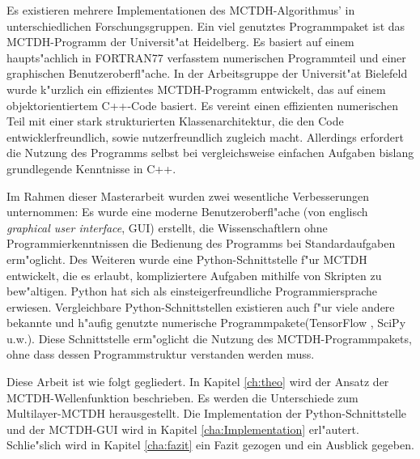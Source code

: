 Es existieren mehrere Implementationen des MCTDH-Algorithmus' in unterschiedlich\-en Forschungsgruppen.
Ein viel genutztes Programmpaket ist das MCTDH-Programm der Universit"at Heidelberg\cite{Heidelberg}. Es
basiert auf einem haupts"achlich in FORTRAN77 verfasstem numerischen Programmteil und einer
graphischen Benutzeroberfl"ache. In der Arbeitsgruppe der Universit"at Bielefeld wurde k"urzlich
ein effizientes MCTDH-Programm entwickelt, das auf einem objektorientiertem C++-Code basiert.
Es vereint einen effizienten numerischen Teil mit einer stark strukturierten Klassenarchitektur,
die den Code entwicklerfreundlich, sowie nutzerfreundlich zugleich macht. Allerdings erfordert
die Nutzung des Programms selbst bei vergleichsweise einfachen Aufgaben bislang
grundlegende Kenntnisse in C++.

Im Rahmen dieser Masterarbeit wurden zwei wesentliche Verbesserungen unternommen: 
Es wurde eine moderne Benutzeroberfl"ache (von englisch \textit{graphical user interface}, GUI) erstellt,
die Wissenschaftlern ohne Programmierkenntnissen die Bedienung des Programms bei Standardaufgaben erm"oglicht.
Des Weiteren wurde eine Python-Schnittstelle f"ur MCTDH entwickelt,
die es erlaubt, kompliziertere Aufgaben mithilfe von Skripten zu bew"altigen.
Python hat sich als einsteigerfreundliche Programmiersprache erwiesen. 
Vergleichbare Python-Schnittstellen existieren auch f"ur viele andere bekannte und h"aufig genutzte 
numerische Programmpakete(TensorFlow \cite{TensorFlow}, SciPy \cite{SciPy} u.w.).
Diese Schnittstelle erm"oglicht die Nutzung des MCTDH-Programmpakets, ohne dass 
dessen Programmstruktur verstanden werden muss.
 
Diese Arbeit ist wie folgt gegliedert. In Kapitel \ref{ch:theo} wird der Ansatz der MCTDH-Wellenfunk\-tion beschrieben. 
Es werden die Unterschiede zum Multilayer-MCTDH herausgestellt. Die Implementation der
Python-Schnittstelle und der MCTDH-GUI wird
in Kapitel \ref{cha:Implementation} erl"autert.
Schlie"slich wird in Kapitel \ref{cha:fazit} ein Fazit gezogen und ein Ausblick gegeben.     
